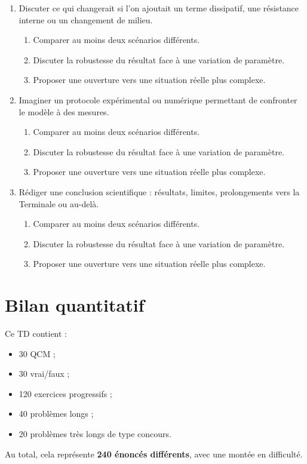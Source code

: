 \documentclass[11pt,a4paper]{article}
\begin{document}
\begin{enumerate}[label=\textbf{Très long \arabic*.},leftmargin=*]
\begin{enumerate}[label=\textbf{\arabic*)}]
\begin{enumerate}[label=\alph*)]
\item Identifier les données utiles et les grandeurs inconnues.
\item Choisir des notations cohérentes et justifier ce choix.
\item Expliquer les pièges conceptuels possibles dans ce contexte.
\end{enumerate}
\item Discuter ce qui changerait si l'on ajoutait un terme dissipatif, une résistance interne ou un changement de milieu.
\begin{enumerate}[label=\alph*)]
\item Comparer au moins deux scénarios différents.
\item Discuter la robustesse du résultat face à une variation de paramètre.
\item Proposer une ouverture vers une situation réelle plus complexe.
\end{enumerate}
\item Imaginer un protocole expérimental ou numérique permettant de confronter le modèle à des mesures.
\begin{enumerate}[label=\alph*)]
\item Comparer au moins deux scénarios différents.
\item Discuter la robustesse du résultat face à une variation de paramètre.
\item Proposer une ouverture vers une situation réelle plus complexe.
\end{enumerate}
\item Rédiger une conclusion scientifique : résultats, limites, prolongements vers la Terminale ou au-delà.
\begin{enumerate}[label=\alph*)]
\item Comparer au moins deux scénarios différents.
\item Discuter la robustesse du résultat face à une variation de paramètre.
\item Proposer une ouverture vers une situation réelle plus complexe.
\end{enumerate}
\end{enumerate}
\end{enumerate}

\section*{Bilan quantitatif}
Ce TD contient :
\begin{itemize}
\item 30 QCM ;
\item 30 vrai/faux ;
\item 120 exercices progressifs ;
\item 40 problèmes longs ;
\item 20 problèmes très longs de type concours.
\end{itemize}

Au total, cela représente \textbf{240 énoncés différents}, avec une montée en difficulté.
\end{document}
